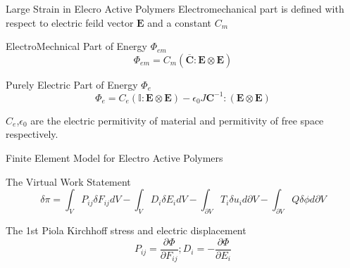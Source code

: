 \documentclass{beamer}
\begin{document}
\begin{frame}{Large Strain in Elecro Active Polymers}
Electromechanical part is defined with respect to electric feild vector
$\mathbf{E}$ and a constant $C_m$
\begin{block}{ElectroMechnical Part of Energy $\Phi_{em}$}
\begin{equation} 
\Phi_{em}=C_m (\overline{\mathbf{C}} : \mathbf{E}\otimes \mathbf{E})
\label{EQN:eap_electromechanical_part}
\end{equation}
\end{block} 

\begin{block}{Purely Electric Part of Energy $\Phi_{e}$}
\begin{equation} 
\Phi_{e}=C_e (\mathbb{I} : \mathbf{E}\otimes \mathbf{E})-\epsilon_0 J \mathbf{C}^{-1} :(\mathbf{E}\otimes \mathbf{E})
\label{EQN:eap_electric_part}
\end{equation}
\end{block} 
$C_e$,$\epsilon_0$ are the electric permitivity of material and permitivity of
free space respectively.

\end{frame}

\begin{frame}{Finite Element Model for Electro Active Polymers}
\begin{block}{The Virtual Work Statement}
\begin{equation} 
\delta \pi=\int_V P_{ij}\delta F_{ij} dV -\int_V D_{i}\delta E_{i}
dV-\int_{\partial V} T_{i}\delta u_{i} d{\partial V}-\int_{\partial V} Q\delta \phi d{\partial V}
\label{EQN:eap_electromechanical_part}
\end{equation}
\end{block} 

\begin{block}{The 1st Piola Kirchhoff stress and electric displacement}
\begin{equation} 
P_{ij}=\frac{\partial \Phi}{\partial F_{ij}} ;D_{i}=-\frac{\partial \Phi}{\partial E_{i}}
\label{EQN:eap_electric_part}
\end{equation}
\end{block} 
\end{frame}
\end{document}
